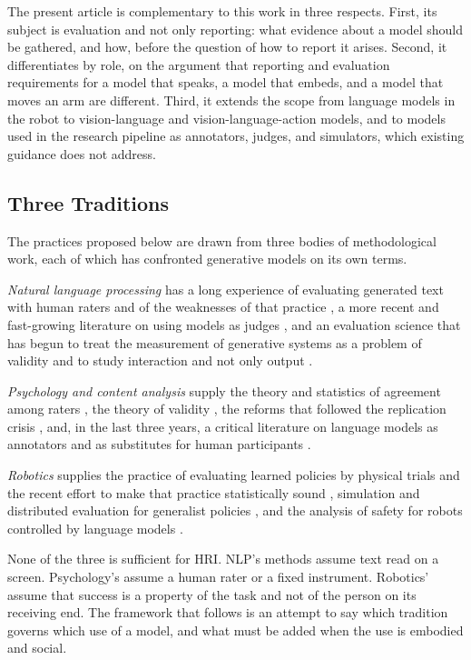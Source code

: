 The present article is complementary to this work in three respects. First,
its subject is evaluation and not only reporting: what evidence about a
model should be gathered, and how, before the question of how to report it
arises. Second, it differentiates by role, on the argument that reporting
and evaluation requirements for a model that speaks, a model that embeds,
and a model that moves an arm are different. Third, it extends the scope
from language models in the robot to vision-language and
vision-language-action models, and to models used in the research pipeline
as annotators, judges, and simulators, which existing guidance does not
address.

\subsection{Three Traditions}

The practices proposed below are drawn from three bodies of methodological
work, each of which has confronted generative models on its own terms.

\emph{Natural language processing} has a long experience of evaluating
generated text with human raters and of the weaknesses of that practice
\cite{vanderlee2021human,howcroft2020twenty,gehrmann2023repairing}, a more
recent and fast-growing literature on using models as judges
\cite{zheng2023judging,gu2026survey}, and an evaluation science that has
begun to treat the measurement of generative systems as a problem of
validity \cite{jacobs2021measurement,wallach2025position,bean2025measuring}
and to study interaction and not only output
\cite{lee2023evaluating,ibrahim2025towards}.

\emph{Psychology and content analysis} supply the theory and statistics of
agreement among raters \cite{krippendorff2019content,hallgren2012computing},
the theory of validity \cite{cronbach1955construct,messick1995validity,
kane2013validating}, the reforms that followed the replication crisis
\cite{opensciencecollaboration2015estimating,simmons2011falsepositive,
nosek2018preregistration}, and, in the last three years, a critical
literature on language models as annotators
\cite{gilardi2023chatgpt,pangakis2023automated,baumann2025large} and as
substitutes for human participants \cite{argyle2023out,wang2025large}.

\emph{Robotics} supplies the practice of evaluating learned policies by
physical trials and the recent effort to make that practice statistically
sound \cite{kressgazit2024robot,agarwal2021deep}, simulation and distributed
evaluation for generalist policies \cite{li2025evaluating,atreya2025roboarena},
and the analysis of safety for robots controlled by language models
\cite{robey2025jailbreaking,sermanet2025generating,hundt2025llm}.

None of the three is sufficient for HRI. NLP's methods assume text read on a
screen. Psychology's assume a human rater or a fixed instrument. Robotics'
assume that success is a property of the task and not of the person on its
receiving end. The framework that follows is an attempt to say which
tradition governs which use of a model, and what must be added when the use
is embodied and social.
